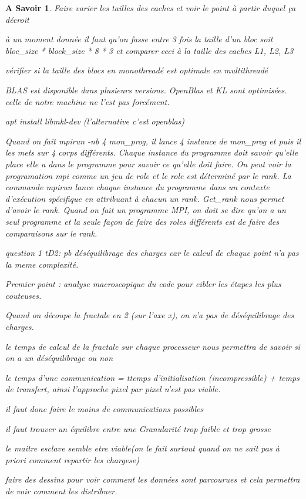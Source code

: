 \documentclass[a4paper,13pt]{book}
\newtheorem{know1}{A Savoir}[section]
\newenvironment{know}{\begin{know1}\color{blue_know}}{\end{know1}}
\begin{document}
\begin{know}
Faire varier les tailles des caches et voir le point à partir duquel ça décroit


à un moment donnée il faut qu'on fasse entre 3 fois la taille d'un bloc soit bloc\_size * block\_size * 8 * 3  et comparer ceci à la taille des caches L1, L2, L3


vérifier si la taille des blocs en monothreadé est optimale en multithreadé

BLAS est disponible dans plusieurs versions. OpenBlas et KL sont optimisées. celle de notre machine ne l'est pas forcément.

apt install libmkl-dev (l'alternative c'est openblas)

Quand on fait mpirun -nb 4 mon\_prog, il lance 4 instance de mon\_prog et puis il les mets sur 4 corps différents. Chaque instance du programme doit savoir qu'elle place elle a dans le programme pour savoir ce qu'elle doit faire. On peut voir la programation mpi comme un jeu de role et le role est déterminé par le rank. La commande mpirun lance chaque instance du programme dans un contexte d'exécution spécifique en attribuant à chacun un rank. Get\_rank nous permet d'avoir le rank. Quand on fait un programme MPI, on doit se dire qu'on a un seul programme et la seule façon de faire des roles différents est de faire des comparaisons sur le rank.

question 1 tD2:  pb déséquilibrage des charges car le calcul de chaque point n'a pas la meme complexité. 

Premier point : analyse macroscopique du code pour cibler les étapes les plus couteuses.

Quand on découpe la fractale en 2 (sur l'axe x), on n'a pas de déséquilibrage des charges. 

le temps de calcul de la fractale sur chaque processeur  nous permettra de savoir si on a un déséquilibrage ou non

le temps d'une communication = ttemps d'initialisation (incompressible) + temps de transfert, ainsi l'approche pixel par pixel n'est pas viable.

il faut donc faire le moins de communications possibles 

il faut trouver un équilibre entre une Granularité trop faible et trop grosse

le maitre esclave semble etre viable(on le fait surtout quand on ne sait pas à priori comment repartir les chargese) 

faire des dessins pour voir comment les données sont parcourues et cela permettra de voir comment les distribuer.


\end{know}
\end{document}
